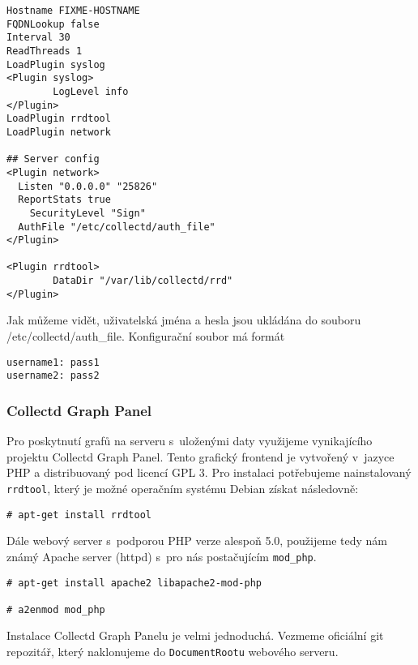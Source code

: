 \begin{verbatim}
Hostname FIXME-HOSTNAME
FQDNLookup false
Interval 30
ReadThreads 1
LoadPlugin syslog
<Plugin syslog>
        LogLevel info
</Plugin>
LoadPlugin rrdtool
LoadPlugin network

## Server config
<Plugin network>
  Listen "0.0.0.0" "25826"
  ReportStats true
	SecurityLevel "Sign"
  AuthFile "/etc/collectd/auth_file"
</Plugin>

<Plugin rrdtool>
        DataDir "/var/lib/collectd/rrd"
</Plugin>
\end{verbatim}

Jak můžeme vidět, uživatelská jména a hesla jsou ukládána do souboru /etc/collectd/auth\_file. Konfigurační soubor má formát

\begin{verbatim}
username1: pass1
username2: pass2
\end{verbatim}



\subsubsection{Collectd Graph Panel}

Pro poskytnutí grafů na serveru s~uloženými daty využijeme vynikajícího projektu Collectd Graph Panel. Tento grafický frontend je vytvořený v~jazyce PHP a distribuovaný pod licencí GPL 3. Pro instalaci potřebujeme nainstalovaný \texttt{rrdtool}, který je možné operačním systému Debian získat následovně:
\begin{verbatim}
# apt-get install rrdtool
\end{verbatim}





Dále webový server s~podporou PHP verze alespoň 5.0, použijeme tedy nám známý Apache server (httpd) s~pro nás postačujícím \texttt{mod_php}.

\begin{verbatim}
# apt-get install apache2 libapache2-mod-php

# a2enmod mod_php
\end{verbatim}


Instalace Collectd Graph Panelu je velmi jednoduchá. Vezmeme oficiální git repozitář, který naklonujeme do \texttt{DocumentRootu} webového serveru.

